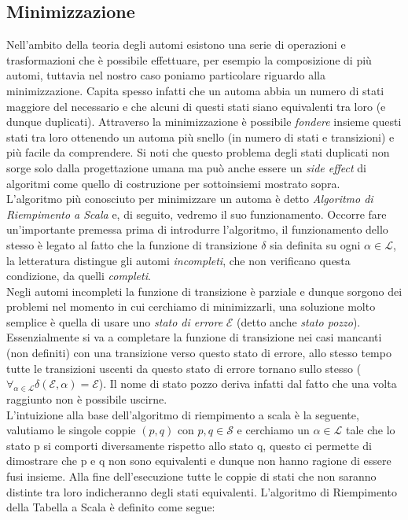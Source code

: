 \subsection{Minimizzazione}
Nell'ambito della teoria degli automi esistono una serie di operazioni e trasformazioni che è possibile effettuare, per esempio la composizione di più automi, tuttavia nel nostro caso poniamo particolare riguardo alla minimizzazione. Capita spesso infatti che un automa abbia un numero di stati maggiore del necessario e che alcuni di questi stati siano equivalenti tra loro (e dunque duplicati). Attraverso la minimizzazione è possibile \emph{fondere} insieme questi stati tra loro ottenendo un automa più snello (in numero di stati e transizioni) e più facile da comprendere. Si noti che questo problema degli stati duplicati non sorge solo dalla progettazione umana ma può anche essere un \emph{side effect} di algoritmi come quello di costruzione per sottoinsiemi mostrato sopra.\\
L'algoritmo più conosciuto per minimizzare un automa è detto \emph{Algoritmo di Riempimento a Scala}\cite{Linguaggi_di_Prorgammazione} e, di seguito, vedremo il suo funzionamento. Occorre fare un'importante premessa prima di introdurre l'algoritmo, il funzionamento dello stesso è legato al fatto che la funzione di transizione $\delta$ sia definita su ogni $\alpha \in \mathcal{L}$, la letteratura distingue gli automi \emph{incompleti}, che non verificano questa condizione, da quelli \emph{completi}.\\
Negli automi incompleti la funzione di transizione è parziale e dunque sorgono dei problemi nel momento in cui cerchiamo di minimizzarli, una soluzione molto semplice è quella di usare uno \emph{stato di errore} $\mathcal{E}$ (detto anche \emph{stato pozzo}). Essenzialmente si va a completare la funzione di transizione nei casi mancanti (non definiti) con una transizione verso questo stato di errore, allo stesso tempo tutte le transizioni uscenti da questo stato di errore tornano sullo stesso ($\forall_{ \alpha \in \mathcal{L}} \delta(\mathcal{E}, \alpha) = \mathcal{E}$). Il nome di stato pozzo deriva infatti dal fatto che una volta raggiunto non è possibile uscirne.\\
L'intuizione alla base dell'algoritmo di riempimento a scala è la seguente, valutiamo le singole coppie $(p, q)$ con $p, q \in \mathcal{S}$ e cerchiamo un $\alpha \in \mathcal{L}$ tale che lo stato p si comporti diversamente rispetto allo stato q, questo ci permette di dimostrare che p e q non sono equivalenti e dunque non hanno ragione di essere fusi insieme. Alla fine dell'esecuzione tutte le coppie di stati che non saranno distinte tra loro indicheranno degli stati equivalenti. L'algoritmo di Riempimento della Tabella a Scala è definito come segue:
